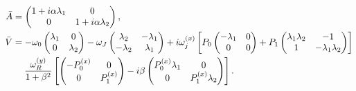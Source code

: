 \begin{subequations}
\begin{align}
    \bar{A} &=
    \begin{pmatrix}
     1+i\alpha\lambda_1 & 0 \\
     0 & 1+i\alpha\lambda_2
    \end{pmatrix}, \\
    \nonumber\bar{V} &=
    -\omega_0\begin{pmatrix}
     \lambda_1 & 0 \\
     0 & \lambda_2
    \end{pmatrix}
    - \omega_J \begin{pmatrix}
     \lambda_2 & -\lambda_1 \\
     -\lambda_2 & \lambda_1
    \end{pmatrix}
    + i\omega_j^{(x)}\left[P_0
    \begin{pmatrix}
     -\lambda_1 & 0 \\
     0 & 0
    \end{pmatrix}
    + P_1
    \begin{pmatrix}
     \lambda_1\lambda_2 & -1 \\
     1 & -\lambda_1\lambda_2
    \end{pmatrix}\right] \\
    &\hspace{4.5mm} \frac{\omega_R^{(y)}}{1+\beta^2}\left[
    \begin{pmatrix}
     -P_0^{(x)} & 0 \\
     0 & P_1^{(x)}
    \end{pmatrix}
    - i \beta
    \begin{pmatrix}
     P_0^{(x)}\lambda_1 & 0 \\
     0 & P_1^{(x)}\lambda_2
    \end{pmatrix}\right].
\end{align}
\end{subequations}